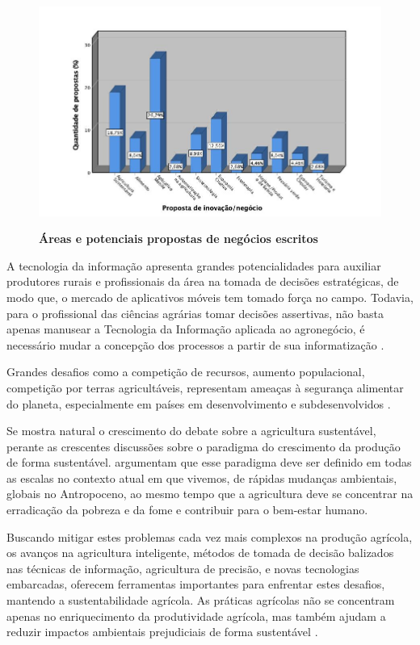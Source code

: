 \begin{figure}[H]
\centering
\caption{\textbf{Áreas e potenciais propostas de negócios escritos}}
\includegraphics[scale=0.3]{Imagens/propostas_negocios.jpg}
\label{figura_11}
\end{figure}

A tecnologia da informação apresenta grandes potencialidades para auxiliar produtores rurais e profissionais da área na tomada de decisões estratégicas, de modo que, o mercado de aplicativos móveis tem tomado força no campo. Todavia, para o profissional das ciências agrárias tomar decisões assertivas, não basta apenas manusear a Tecnologia da Informação aplicada ao agronegócio, é necessário mudar a concepção dos processos a partir de sua informatização \cite{ferraz_tecnologia_2017,sharma_systematic_2020}.

Grandes desafios como a competição de recursos, aumento populacional, competição por terras agricultáveis, representam ameaças à segurança alimentar do planeta, especialmente em países em desenvolvimento e subdesenvolvidos \cite{pardey_bounds_2014}.

Se mostra natural o crescimento do debate sobre a agricultura sustentável, perante as crescentes discussões sobre o paradigma do crescimento da produção de forma sustentável.
 argumentam que esse paradigma deve ser definido em todas as escalas no contexto atual em que vivemos, de rápidas mudanças ambientais, globais no Antropoceno, ao mesmo tempo que a agricultura  deve se concentrar na erradicação da pobreza e da fome e contribuir para o bem-estar humano.

Buscando mitigar estes problemas cada vez mais complexos na produção agrícola, os avanços na agricultura inteligente, métodos de tomada de decisão balizados nas técnicas de informação, agricultura de precisão, e novas tecnologias embarcadas, oferecem ferramentas importantes para enfrentar estes desafios, mantendo a sustentabilidade agrícola. As práticas agrícolas não se concentram apenas no enriquecimento da produtividade agrícola, mas também ajudam a reduzir impactos ambientais prejudiciais de forma sustentável \cite{adnan_effects_2018,rockstrom_sustainable_2017,ye_bio-organic_2020}.

